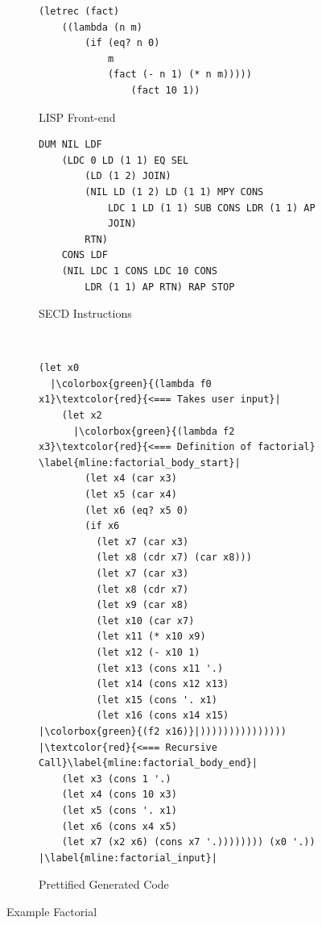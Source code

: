 \documentclass[a4paper,12pt,twoside,openright]{report}
\theoremstyle{definition}
\begin{document}
\begin{figure}[htp!]
\centering
    \begin{subfigure}{.5\linewidth}
         \centering
         \begin{verbatim}
(letrec (fact)
    ((lambda (n m)
        (if (eq? n 0)
            m
            (fact (- n 1) (* n m)))))
                (fact 10 1))
         \end{verbatim}
         \caption{LISP Front-end}
         \label{lst:secd_fac_lisp}
    \end{subfigure}%
    \begin{subfigure}{.5\linewidth}
         \centering
         \begin{verbatim}
DUM NIL LDF
    (LDC 0 LD (1 1) EQ SEL
        (LD (1 2) JOIN)
        (NIL LD (1 2) LD (1 1) MPY CONS
            LDC 1 LD (1 1) SUB CONS LDR (1 1) AP
            JOIN)
        RTN)
    CONS LDF
    (NIL LDC 1 CONS LDC 10 CONS
        LDR (1 1) AP RTN) RAP STOP
         \end{verbatim}
    \caption{SECD Instructions}
    \label{lst:secd_fac_ops}
    \end{subfigure}\\[1ex]
    \par\bigskip
    \begin{subfigure}{\linewidth}
        \centering
        \begin{verbatim}
(let x0
  |\colorbox{green}{(lambda f0 x1}\textcolor{red}{<=== Takes user input}|
    (let x2
      |\colorbox{green}{(lambda f2 x3}\textcolor{red}{<=== Definition of factorial} \label{mline:factorial_body_start}|
        (let x4 (car x3)
        (let x5 (car x4)
        (let x6 (eq? x5 0)
        (if x6
          (let x7 (car x3)
          (let x8 (cdr x7) (car x8)))
          (let x7 (car x3)
          (let x8 (cdr x7)
          (let x9 (car x8)
          (let x10 (car x7)
          (let x11 (* x10 x9)
          (let x12 (- x10 1)
          (let x13 (cons x11 '.)
          (let x14 (cons x12 x13)
          (let x15 (cons '. x1)
          (let x16 (cons x14 x15) |\colorbox{green}{(f2 x16)}|))))))))))))))) |\textcolor{red}{<=== Recursive Call}\label{mline:factorial_body_end}|
    (let x3 (cons 1 '.)
    (let x4 (cons 10 x3)
    (let x5 (cons '. x1)
    (let x6 (cons x4 x5)
    (let x7 (x2 x6) (cons x7 '.)))))))) (x0 '.)) |\label{mline:factorial_input}|
        \end{verbatim}
        \caption{Prettified Generated Code}
        \label{lst:secd_fac_ped}
    \end{subfigure}
\caption{Example Factorial}
\label{lst:secd_fac_all}
\end{figure}
\end{document}
